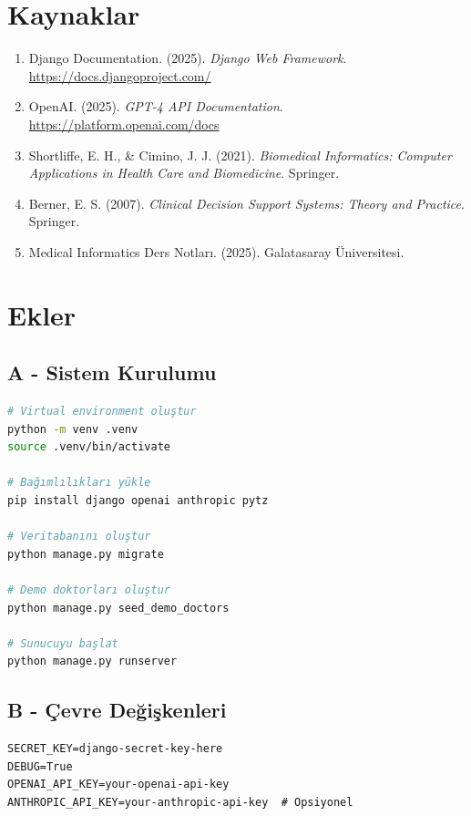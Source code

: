 \documentclass[12pt,a4paper]{article}
\begin{document}
\section{Kaynaklar}

\begin{enumerate}
    \item Django Documentation. (2025). \textit{Django Web Framework}. \url{https://docs.djangoproject.com/}
    \item OpenAI. (2025). \textit{GPT-4 API Documentation}. \url{https://platform.openai.com/docs}
    \item Shortliffe, E. H., \& Cimino, J. J. (2021). \textit{Biomedical Informatics: Computer Applications in Health Care and Biomedicine}. Springer.
    \item Berner, E. S. (2007). \textit{Clinical Decision Support Systems: Theory and Practice}. Springer.
    \item Medical Informatics Ders Notları. (2025). Galatasaray Üniversitesi.
\end{enumerate}

\section{Ekler}

\subsection{A - Sistem Kurulumu}
\begin{lstlisting}[language=bash, caption=Kurulum komutları]
# Virtual environment oluştur
python -m venv .venv
source .venv/bin/activate

# Bağımlılıkları yükle
pip install django openai anthropic pytz

# Veritabanını oluştur
python manage.py migrate

# Demo doktorları oluştur
python manage.py seed_demo_doctors

# Sunucuyu başlat
python manage.py runserver
\end{lstlisting}

\subsection{B - Çevre Değişkenleri}
\begin{lstlisting}[caption=.env dosyası]
SECRET_KEY=django-secret-key-here
DEBUG=True
OPENAI_API_KEY=your-openai-api-key
ANTHROPIC_API_KEY=your-anthropic-api-key  # Opsiyonel
\end{lstlisting}
\end{document}
